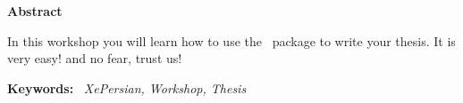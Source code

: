 \thispagestyle{empty} %
\begin{latin} %

\centerline{\textbf{\large{Abstract}}}
\vskip 1cm
\noindent In this workshop you will learn how to use the \XePersian\ package to write your thesis. It is very easy! and no fear, trust us!


\textbf{Keywords:} \
\textit{XePersian, Workshop, Thesis}

\end{latin}
